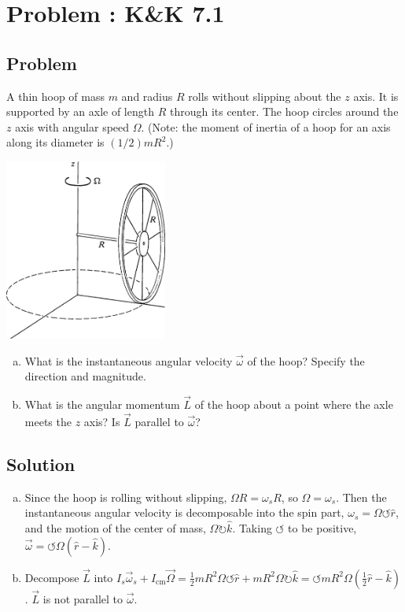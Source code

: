 \documentclass[solutions]{esg8012pset}
\date{Month Day\csname latex@error\endcsname {Date not yet decided}}
\begin{document}
\section{Problem \thesection: K\&K 7.1}
\subsection{Problem}
  A thin hoop of mass $m$ and radius $R$ rolls without slipping about the $z$ axis. It is supported by an axle of length $R$ through its center. The hoop circles around the $z$ axis with angular speed $\Omega$. (Note: the moment of inertia of a hoop for an axis along its diameter is $(1 / 2)mR^2$.)
  \begin{center}\includegraphics[width=0.4\textwidth]{ps11_1}\end{center}
  \begin{enumerate}[(a)]
    \item What is the instantaneous angular velocity $\vec \omega$ of the hoop? Specify the direction and magnitude.
    \item What is the angular momentum $\vec L$ of the hoop about a point where the axle meets the $z$ axis? Is $\vec L$ parallel to $\vec \omega$?
  \end{enumerate}
\subsection{Solution}
\begin{enumerate}[(a)]
  \item Since the hoop is rolling without slipping, $\Omega R = \omega_s R$, so $\Omega = \omega_s$.  Then the instantaneous angular velocity is decomposable into the spin part, $\omega_s = \Omega \leftturn \hat r$, and the motion of the center of mass, $\Omega \rightturn\hat k$.  Taking $\leftturn$ to be positive, $\vec \omega = \leftturn\Omega(\hat r - \hat k)$.
  \item Decompose $\vec L$ into $I_s \vec \omega_s + I_\text{cm} \vec \Omega = \frac{1}{2} m R^2 \Omega \leftturn \hat r + m R^2 \Omega\rightturn \hat k = \leftturn mR^2 \Omega\left(\frac12 \hat r - \hat k\right)$.  $\vec L$ is not parallel to $\vec \omega$.
\end{enumerate}
\end{document}
